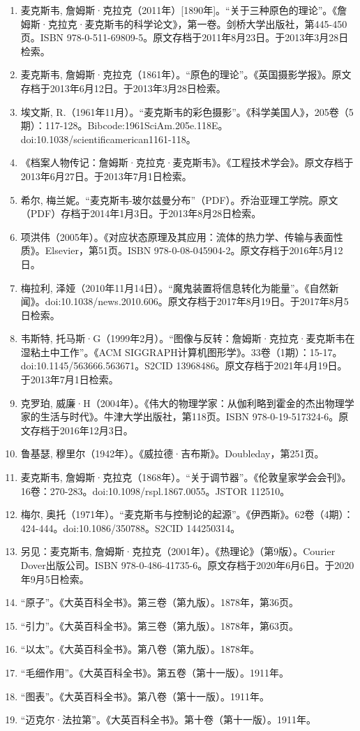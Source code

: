 \begin{enumerate}
\item 麦克斯韦, 詹姆斯·克拉克（2011年）[1890年]。“关于三种原色的理论”。《詹姆斯·克拉克·麦克斯韦的科学论文》，第一卷。剑桥大学出版社，第445-450页。ISBN 978-0-511-69809-5。原文存档于2011年8月23日。于2013年3月28日检索。  
\item 麦克斯韦, 詹姆斯·克拉克（1861年）。“原色的理论”。《英国摄影学报》。原文存档于2013年6月12日。于2013年3月28日检索。  
\item 埃文斯, R.（1961年11月）。“麦克斯韦的彩色摄影”。《科学美国人》，205卷（5期）：117-128。Bibcode:1961SciAm.205e.118E。doi:10.1038/scientificamerican1161-118。  
\item 《档案人物传记：詹姆斯·克拉克·麦克斯韦》。《工程技术学会》。原文存档于2013年6月27日。于2013年7月1日检索。  
\item 希尔, 梅兰妮。“麦克斯韦-玻尔兹曼分布”（PDF）。乔治亚理工学院。原文（PDF）存档于2014年1月3日。于2013年8月28日检索。  
\item 项洪伟（2005年）。《对应状态原理及其应用：流体的热力学、传输与表面性质》。Elsevier，第51页。ISBN 978-0-08-045904-2。原文存档于2016年5月12日。
\item 梅拉利, 泽娅（2010年11月14日）。“魔鬼装置将信息转化为能量”。《自然新闻》。doi:10.1038/news.2010.606。原文存档于2017年8月19日。于2017年8月5日检索。  
\item 韦斯特, 托马斯·G（1999年2月）。“图像与反转：詹姆斯·克拉克·麦克斯韦在湿粘土中工作”。《ACM SIGGRAPH计算机图形学》。33卷（1期）：15-17。doi:10.1145/563666.563671。S2CID 13968486。原文存档于2021年4月19日。于2013年7月1日检索。  
\item 克罗珀, 威廉·H（2004年）。《伟大的物理学家：从伽利略到霍金的杰出物理学家的生活与时代》。牛津大学出版社，第118页。ISBN 978-0-19-517324-6。原文存档于2016年12月3日。  
\item 鲁基瑟, 穆里尔（1942年）。《威拉德·吉布斯》。Doubleday，第251页。  
\item 麦克斯韦, 詹姆斯·克拉克（1868年）。“关于调节器”。《伦敦皇家学会会刊》。16卷：270-283。doi:10.1098/rspl.1867.0055。JSTOR 112510。  
\item 梅尔, 奥托（1971年）。“麦克斯韦与控制论的起源”。《伊西斯》。62卷（4期）：424-444。doi:10.1086/350788。S2CID 144250314。  
\item 另见：麦克斯韦, 詹姆斯·克拉克（2001年）。《热理论》（第9版）。Courier Dover出版公司。ISBN 978-0-486-41735-6。原文存档于2020年6月6日。于2020年9月5日检索。
\item “原子”。《大英百科全书》。第三卷（第九版）。1878年，第36页。  
\item “引力”。《大英百科全书》。第三卷（第九版）。1878年，第63页。  
\item “以太”。《大英百科全书》。第八卷（第九版）。1878年。  
\item “毛细作用”。《大英百科全书》。第五卷（第十一版）。1911年。  
\item “图表”。《大英百科全书》。第八卷（第十一版）。1911年。  
\item “迈克尔·法拉第”。《大英百科全书》。第十卷（第十一版）。1911年。
\end{enumerate}
